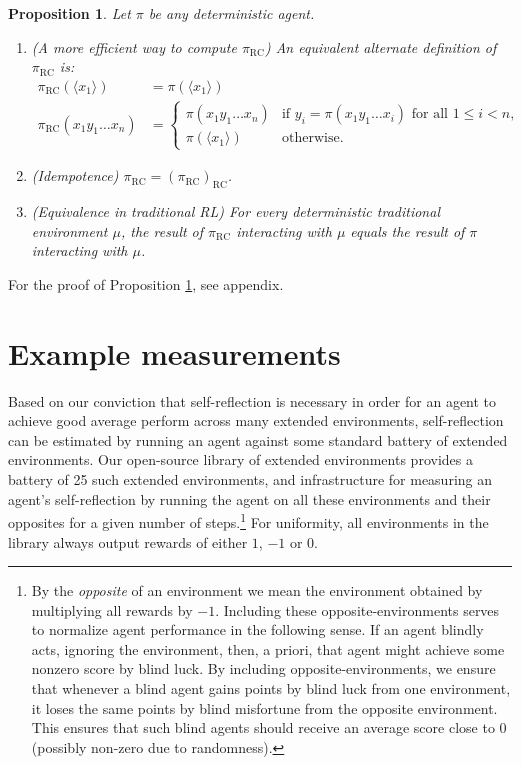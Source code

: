 \documentclass{article}
\newtheorem{myproposition}[mytheorem]{Proposition}
\def\RC{\textrm{RC}}
\begin{document}
\begin{myproposition}
\label{transformationproposition}
  Let $\pi$ be any deterministic agent.
  \begin{enumerate}
    \item
    (A more efficient way to compute $\pi_{\RC}$)
    An equivalent alternate definition of $\pi_{\RC}$ is:
    \begin{align*}
      \pi_{\RC}(\langle x_1\rangle) &= \pi(\langle x_1\rangle)\\
      \pi_{\RC}(x_1y_1\ldots x_n) &=
      \begin{cases}
        \pi(x_1y_1\ldots x_n) & \mbox{if $y_i=\pi(x_1y_1\ldots x_i)$ for all $1\leq i<n$,}\\
        \pi(\langle x_1\rangle) & \mbox{otherwise.}
      \end{cases}
    \end{align*}
    \item
    (Idempotence) $\pi_{\RC}=(\pi_{\RC})_{\RC}$.
    \item
    (Equivalence in traditional RL)
    For every deterministic traditional environment $\mu$, the result of $\pi_{\RC}$
    interacting with $\mu$ equals the result of $\pi$ interacting with $\mu$.
  \end{enumerate}
\end{myproposition}

For the proof of Proposition \ref{transformationproposition}, see appendix.

\section{Example measurements}

Based on our conviction that self-reflection is necessary in order for an agent to
achieve good average perform across many extended environments, self-reflection can
be estimated by running an agent against some standard battery of extended environments.
Our open-source library of extended environments \cite{library} provides a battery of
25 such extended environments, and infrastructure for measuring an agent's self-reflection
by running the agent on all these environments and their opposites for a given number of
steps.\footnote{By the \emph{opposite} of an environment we mean the environment
obtained by multiplying
all rewards by $-1$. Including these opposite-environments serves to normalize
agent performance in the following sense. If an agent blindly acts, ignoring the environment,
then, a priori, that agent might achieve some nonzero score by blind luck. By including
opposite-environments, we ensure that whenever a blind agent gains points by blind luck
from one environment, it loses the same points by blind misfortune from the opposite
environment. This ensures that such blind agents should receive an average score close to
$0$ (possibly non-zero due to randomness).} For uniformity, all environments in the library
always output rewards of either $1$, $-1$ or $0$.
\end{document}
